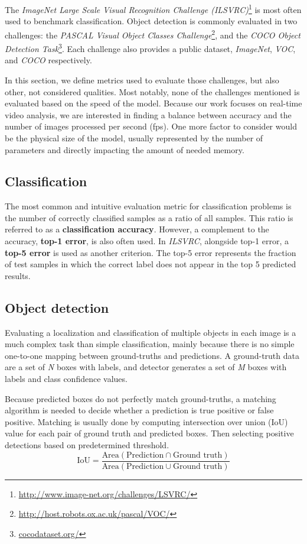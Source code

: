 The \textit{ImageNet Large Scale Visual Recognition Challenge (ILSVRC)}\footnote{\url{http://www.image-net.org/challenges/LSVRC/}} is most often used to benchmark classification. Object detection is commonly evaluated in two challenges: the \textit{PASCAL Visual Object Classes Challenge}\footnote{\url{http://host.robots.ox.ac.uk/pascal/VOC/}}, and the \textit{COCO Object Detection Task}\footnote{\url{cocodataset.org/}}. Each challenge also provides a public dataset, \textit{ImageNet}, \textit{VOC}, and \textit{COCO} respectively.

In this section, we define metrics used to evaluate those challenges, but also other, not considered qualities. Most notably, none of the challenges mentioned is evaluated based on the speed of the model. Because our work focuses on real-time video analysis, we are interested in finding a balance between accuracy and the number of images processed per second (fps). One more factor to consider would be the physical size of the model, usually represented by the number of parameters and directly impacting the amount of needed memory.

\subsection*{Classification}
The most common and intuitive evaluation metric for classification problems is the number of correctly classified samples as a ratio of all samples. This ratio is referred to as a \textbf{classification accuracy}. However, a complement to the accuracy, \textbf{top-1 error}, is also often used. In \textit{ILSVRC},  alongside top-1 error, a \textbf{top-5 error} is used as another criterion. The top-5 error represents the fraction of test samples in which the correct label does not appear in the top 5 predicted results.

\subsection*{Object detection}
Evaluating a localization and classification of multiple objects in each image is a much complex task than simple classification, mainly because there is no simple one-to-one mapping between ground-truths and predictions. A ground-truth data are a set of \textit{N} boxes with labels, and detector generates a set of \textit{M} boxes with labels and class confidence values.

Because predicted boxes do not perfectly match ground-truths, a matching algorithm is needed to decide whether a prediction is true positive or false positive. Matching is usually done by computing intersection over union (IoU) value for each pair of ground truth and predicted boxes. Then selecting positive detections based on predetermined threshold.
$$\text{IoU} = \frac{\text{Area}(\text{Prediction} \cap \text{Ground truth})}{\text{Area}(\text{Prediction} \cup \text{Ground truth})}$$


